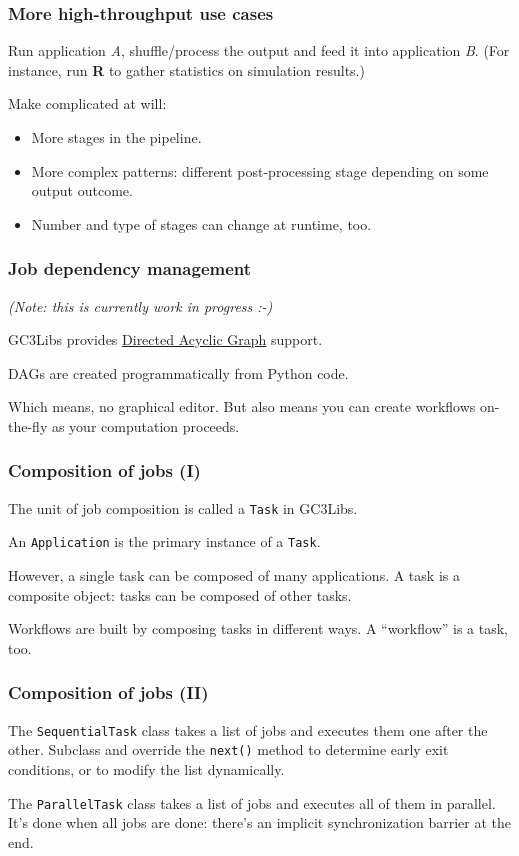 \documentclass[presentation]{beamer}
\begin{document}
\begin{frame}
\frametitle{More high-throughput use cases}
\label{sec-21}

  Run application \emph{A}, shuffle/process the output and feed it into
  application \emph{B}.  (For instance, run \textbf{R} to gather statistics on
  simulation results.)

  Make complicated at will: 
\begin{itemize}
\item More stages in the pipeline.
\item More complex patterns: different post-processing stage depending
    on some output outcome.
\item Number and type of stages can change at runtime, too.
\end{itemize}
\end{frame}
\begin{frame}
\frametitle{Job dependency management}
\label{sec-22}

  \emph{(Note: this is currently work in progress :-)}

  GC3Libs provides \href{http://en.wikipedia.org/wiki/Directed_acyclic_graph}{Directed Acyclic Graph} support.

  DAGs are created programmatically from Python code.

  Which means, no graphical editor.  But also means you can create
  workflows on-the-fly as your computation proceeds.
\end{frame}
\begin{frame}
\frametitle{Composition of jobs (I)}
\label{sec-23}

  The unit of job composition is called a \texttt{Task} in GC3Libs.

  An \texttt{Application} is the primary instance of a \texttt{Task}.

  However, a single task can be composed of many applications.
  A task is a composite object: tasks can be composed of other tasks.

  Workflows are built by composing tasks in different ways.
  A ``workflow'' is a task, too.
\end{frame}
\begin{frame}
\frametitle{Composition of jobs (II)}
\label{sec-24}

  The \texttt{SequentialTask} class takes a list of jobs and executes them
  one after the other. Subclass and override the \texttt{next()} method to
  determine early exit conditions, or to modify the list dynamically.

  The \texttt{ParallelTask} class takes a list of jobs and executes all of
  them in parallel.  It's done when all jobs are done: there's an
  implicit synchronization barrier at the end.
  
\end{frame}
\end{document}
